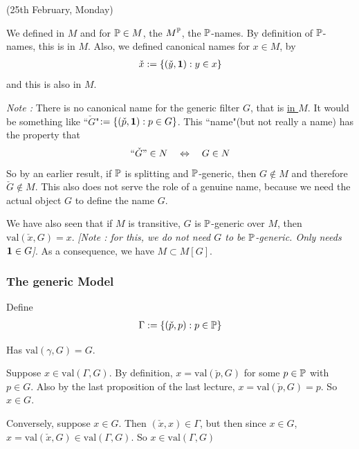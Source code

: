 \documentclass[12pt,a4paper]{article}
\newenvironment{proof}
{\begin{changemargin}{0.5cm}{0.5cm} 
	}%
	{\end{changemargin}
}
\newenvironment{p}
{\begin{proof} 
	}%
	{\end{proof}
}
\begin{document}
\newday

(25th February, Monday)
\s

We defined in $M$ and for $\mathbb{P} \in M$, the $M^{\mathbb{P}}$, the $\mathbb{P}$-names. By definition of $\mathbb{P}$-names, this is in $M$. Also, we defined canonical names for $x\in M$, by
\begin{align*}
\check{x} := \{(\check{y}, \bm{1}): y\in x\}
\end{align*}
and this is also in $M$.
\s

\emph{Note :} There is no canonical name for the generic filter $G$, that is \underline{in $M$}. It would be something like ``$\check{G}$"$:= \{(\check{p}, \bm{1}) : p\in G\}$. This ``name"(but not really a name) has the property that
\begin{align*}
``\check{G}" \in N \quad \Leftrightarrow \quad G\in N
\end{align*}
So by an earlier result, if $\mathbb{P}$ is splitting and $\mathbb{P}$-generic, then $G\not\in M$ and therefore $\check{G} \not\in M$. This also does not serve the role of a genuine name, because we need the actual object $G$ to define the name $G$.
\s

We have also seen that if $M$ is transitive, $G$ is $\mathbb{P}$-generic over $M$, then $\text{val}(\check{x}, G) = x$. \emph{[Note : for this, we do not need $G$ to be $\mathbb{P}$-generic. Only needs $\bm{1}\in G$]}. As a consequence, we have $M\subset M[G]$.
\s

\subsubsection*{The generic Model}

 Define
\begin{align*}
\Gamma := \{(\check{p}, p) : p\in \mathbb{P} \}
\end{align*}

\lem Has $\text{val}(\gamma, G) = G$.
\begin{p}
\pf Suppose $x\in \text{val}(\Gamma, G)$. By definition, $x= \text{val}(\check{p}, G)$ for some $p\in \mathbb{P}$ with $p\in G$. Also by the last proposition of the last lecture, $x= \text{val}(\check{p}, G) =p$. So $x\in G$.

\quad Conversely, suppose $x\in G$. Then $(\check{x}, x)\in \Gamma$, but then since $x\in G$, $x= \text{val}(\check{x}, G)\in \text{val}(\Gamma, G)$. So $x\in \text{val}(\Gamma, G)$

\eop
\end{p}
\s
\end{document}
